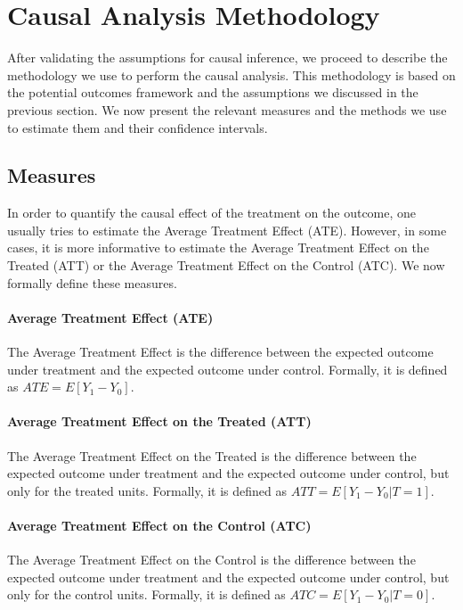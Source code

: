 \documentclass[11pt]{article}
\begin{document}
\section{Causal Analysis Methodology}

After validating the assumptions for causal inference, we proceed to describe the methodology we use to perform the causal analysis. This methodology is based on the potential outcomes framework and the assumptions we discussed in the previous section. We now present the relevant measures and the methods we use to estimate them and their confidence intervals.

\subsection{Measures}

In order to quantify the causal effect of the treatment on the outcome, one usually tries to estimate the Average Treatment Effect (ATE). However, in some cases, it is more informative to estimate the Average Treatment Effect on the Treated (ATT) or the Average Treatment Effect on the Control (ATC). We now formally define these measures.

\paragraph{Average Treatment Effect (ATE)} The Average Treatment Effect is the difference between the expected outcome under treatment and the expected outcome under control. Formally, it is defined as $ATE = E[Y_1 - Y_0]$.

\paragraph{Average Treatment Effect on the Treated (ATT)} The Average Treatment Effect on the Treated is the difference between the expected outcome under treatment and the expected outcome under control, but only for the treated units. Formally, it is defined as $ATT = E[Y_1 - Y_0 | T = 1]$. 

\paragraph{Average Treatment Effect on the Control (ATC)} The Average Treatment Effect on the Control is the difference between the expected outcome under treatment and the expected outcome under control, but only for the control units. Formally, it is defined as $ATC = E[Y_1 - Y_0 | T = 0]$. 
\end{document}
